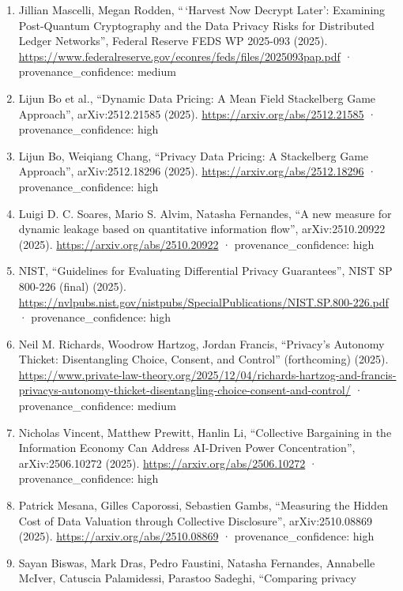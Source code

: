 \documentclass[
  11pt,
]{article}
\begin{document}
\begin{enumerate}
  for Data Law'', arXiv:2510.26727 (2025).
  \url{https://arxiv.org/abs/2510.26727} · provenance\_confidence: high
\item
  Jillian Mascelli, Megan Rodden, ``\,`Harvest Now Decrypt Later':
  Examining Post-Quantum Cryptography and the Data Privacy Risks for
  Distributed Ledger Networks'', Federal Reserve FEDS WP 2025-093
  (2025).
  \url{https://www.federalreserve.gov/econres/feds/files/2025093pap.pdf}
  · provenance\_confidence: medium
\item
  Lijun Bo et al., ``Dynamic Data Pricing: A Mean Field Stackelberg Game
  Approach'', arXiv:2512.21585 (2025).
  \url{https://arxiv.org/abs/2512.21585} · provenance\_confidence: high
\item
  Lijun Bo, Weiqiang Chang, ``Privacy Data Pricing: A Stackelberg Game
  Approach'', arXiv:2512.18296 (2025).
  \url{https://arxiv.org/abs/2512.18296} · provenance\_confidence: high
\item
  Luigi D. C. Soares, Mario S. Alvim, Natasha Fernandes, ``A new measure
  for dynamic leakage based on quantitative information flow'',
  arXiv:2510.20922 (2025). \url{https://arxiv.org/abs/2510.20922} ·
  provenance\_confidence: high
\item
  NIST, ``Guidelines for Evaluating Differential Privacy Guarantees'',
  NIST SP 800-226 (final) (2025).
  \url{https://nvlpubs.nist.gov/nistpubs/SpecialPublications/NIST.SP.800-226.pdf}
  · provenance\_confidence: high
\item
  Neil M. Richards, Woodrow Hartzog, Jordan Francis, ``Privacy's
  Autonomy Thicket: Disentangling Choice, Consent, and Control''
  (forthcoming) (2025).
  \url{https://www.private-law-theory.org/2025/12/04/richards-hartzog-and-francis-privacys-autonomy-thicket-disentangling-choice-consent-and-control/}
  · provenance\_confidence: medium
\item
  Nicholas Vincent, Matthew Prewitt, Hanlin Li, ``Collective Bargaining
  in the Information Economy Can Address AI-Driven Power
  Concentration'', arXiv:2506.10272 (2025).
  \url{https://arxiv.org/abs/2506.10272} · provenance\_confidence: high
\item
  Patrick Mesana, Gilles Caporossi, Sebastien Gambs, ``Measuring the
  Hidden Cost of Data Valuation through Collective Disclosure'',
  arXiv:2510.08869 (2025). \url{https://arxiv.org/abs/2510.08869} ·
  provenance\_confidence: high
\item
  Sayan Biswas, Mark Dras, Pedro Faustini, Natasha Fernandes, Annabelle
  McIver, Catuscia Palamidessi, Parastoo Sadeghi, ``Comparing privacy

\end{enumerate}
\end{document}
